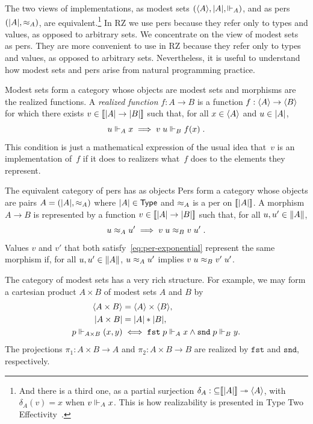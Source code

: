 The two views of implementations, as modest sets $(\langle A \rangle,
|A|, {\Vdash_A})$, and as pers $(|A|, {\approx_A})$, are
equivalent.\footnote{And there is a third one, as a partial surjection
  $\delta_A : {\subseteq}[\![|A|]\!] \twoheadrightarrow \langle A \rangle$, with
  $\delta_A(v) = x$ when $v \Vdash_A x$. This is how realizability is
  presented in Type Two Effectivity~\cite{Wei00}.} 
%
\iflong 
%
In RZ we use pers because they refer only to types and values,
as opposed to arbitrary sets.
%
\else
We concentrate on the view of modest sets as pers. They are more
convenient to use in RZ because they refer only to types and values,
as opposed to arbitrary sets.
\fi
%
Nevertheless, it is useful to understand
how modest sets and pers arise from natural programming practice.

\iflong
%
Modest sets form a category whose objects are modest sets and
morphisms are the realized functions. A \emph{realized function} $f :
A \to B$ is a function $f : \langle A \rangle \to \langle B \rangle$ for which there
exists $v \in [\![|A| \to |B|]\!]$ such that, for all
$x \in \langle A \rangle$ and $u \in |A|$,
%
\begin{equation}
  \label{eq:rz-function-space}
  u \Vdash_A x \implies v\;u \Vdash_B f(x) \;.
\end{equation}
%
This condition is just a mathematical expression of the usual idea
that~$v$ is an implementation of~$f$ if it does to realizers
what~$f$ does to the elements they represent.
\fi

\iflong
The equivalent category of pers has as objects
\else
Pers form a category whose objects are
\fi
%
pairs $A = (|A|, {\approx_A})$ where $|A| \in \mathsf{Type}$ and
$\approx_A$ is a per on $[\![|A|]\!]$. A morphism $A \to B$ is
represented by a function $v\in [\![|A| \to |B|]\!]$
such that, for all $u, u' \in \|A\|$,
%
\begin{equation}
  \label{eq:per-exponential}
  u \approx_A u' \implies v\;u \approx_B v\;u' \;.
\end{equation}
%
Values $v$ and $v'$ that both satisfy~\eqref{eq:per-exponential}
represent the same morphism if, for all $u, u' \in \|A\|$,
$u \approx_A u'$ implies $v\;u \approx_B v'\;u'$.

\iflong
%
The category of modest sets has a very rich structure. For example, we
may form a cartesian product $A \times B$ of modest sets $A$ and $B$
by
%
\begin{align*}
  \langle A \times B \rangle &= \langle A \rangle \times \langle B \rangle,\\
  |A \times B| &= |A| * |B|,\\
  p \Vdash_{A \times B} (x,y) &\iff
  \mathtt{fst}\;p \Vdash_A x \land \mathtt{snd}\;p \Vdash_B y.
\end{align*}
%
The projections $\pi_1 : A \times B \to A$ and $\pi_2 : A \times B \to
B$ are realized by $\mathtt{fst}$ and $\mathtt{snd}$, respectively.

